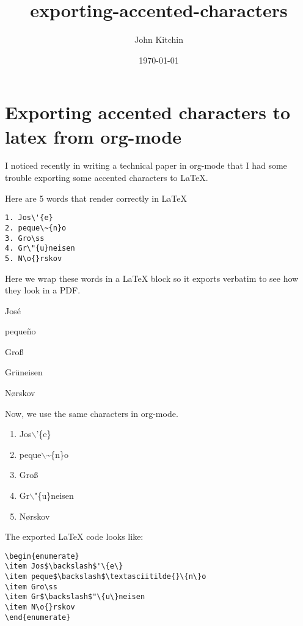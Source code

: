 \documentclass[11pt]{article}
\author{John Kitchin}
\date{\today}
\title{exporting-accented-characters}
\begin{document}
\maketitle
\tableofcontents

\section{Exporting accented characters to latex from org-mode}
\label{sec-1}

I noticed recently in writing a technical paper in org-mode that I had some trouble exporting some accented characters to \LaTeX{}.

Here are 5 words that render correctly in \LaTeX{}

\begin{verbatim}
1. Jos\'{e}
2. peque\~{n}o
3. Gro\ss
4. Gr\"{u}neisen
5. N\o{}rskov
\end{verbatim}

Here we wrap these words in a \LaTeX{} block so it exports verbatim to see how they look in a PDF.

Jos\'{e}

peque\~{n}o

Gro\ss

Gr\"{u}neisen

N\o{}rskov

Now, we use the same characters in org-mode.

\begin{enumerate}
\item Jos$\backslash$'\{e\}
\item peque$\backslash$\textasciitilde{}\{n\}o
\item Gro\ss
\item Gr$\backslash$"\{u\}neisen
\item N\o{}rskov
\end{enumerate}

The exported \LaTeX{} code looks like:
\begin{verbatim}
\begin{enumerate}
\item Jos$\backslash$'\{e\}
\item peque$\backslash$\textasciitilde{}\{n\}o
\item Gro\ss
\item Gr$\backslash$"\{u\}neisen
\item N\o{}rskov
\end{enumerate}
\end{verbatim}
\end{document}
